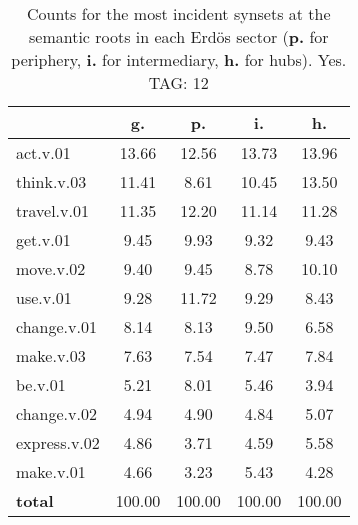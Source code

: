 \begin{table}[h!]
\begin{center}
\begin{tabular}{| l || c | c | c | c |}\hline
 & {\bf g.} & {\bf p.} & {\bf i.} & {\bf h.} \\\hline\hline
act.v.01 & 13.66  & 12.56  & 13.73  & 13.96 \\\hline
think.v.03 & 11.41  & 8.61  & 10.45  & 13.50 \\\hline
travel.v.01 & 11.35  & 12.20  & 11.14  & 11.28 \\\hline
get.v.01 & 9.45  & 9.93  & 9.32  & 9.43 \\\hline
move.v.02 & 9.40  & 9.45  & 8.78  & 10.10 \\\hline
use.v.01 & 9.28  & 11.72  & 9.29  & 8.43 \\\hline
change.v.01 & 8.14  & 8.13  & 9.50  & 6.58 \\\hline
make.v.03 & 7.63  & 7.54  & 7.47  & 7.84 \\\hline
be.v.01 & 5.21  & 8.01  & 5.46  & 3.94 \\\hline
change.v.02 & 4.94  & 4.90  & 4.84  & 5.07 \\\hline
express.v.02 & 4.86  & 3.71  & 4.59  & 5.58 \\\hline
make.v.01 & 4.66  & 3.23  & 5.43  & 4.28 \\\hline\hline
{{\bf total}} & 100.00  & 100.00  & 100.00  & 100.00 \\\hline
\end{tabular}
\caption{Counts for the most incident synsets at the semantic roots in each Erd\"os sector ({\bf p.} for periphery, {\bf i.} for intermediary, {\bf h.} for hubs). Yes. TAG: 12}
\end{center}
\end{table}